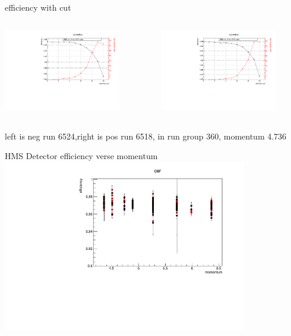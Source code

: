 \documentclass[aspectratio=169,xcolor=dvipsnames]{beamer}
\begin{document}
\begin{frame}{efficiency with cut}
  \begin{columns}
    \begin{column}[T]{0.5\textwidth}
  \includegraphics[width = 0.8\textwidth]{results/pid/HMS_cer_6524.pdf}
\end{column}
\begin{column}[T]{0.5\textwidth}
  \includegraphics[width = 0.8\textwidth]{results/pid/HMS_cer_6518.pdf}
\end{column}
\end{columns}
  left is neg run 6524,right is pos run 6518, in run group 360, momentum 4.736
  
\end{frame}
\begin{frame}{HMS Detector efficiency verse momentum}
  \includegraphics[width = 0.8\textwidth]{results/pid/HMS_cer_DE_momentum.pdf}
\end{frame}
\end{document}
